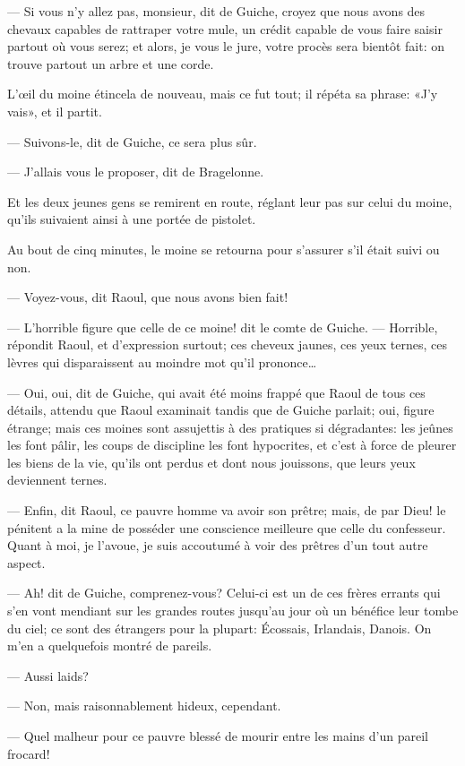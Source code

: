— Si vous n'y allez pas, monsieur, dit de Guiche, croyez que nous avons des chevaux capables de rattraper votre mule, un crédit capable de vous faire saisir partout où vous serez; et alors, je vous le jure, votre procès sera bientôt fait: on trouve partout un arbre et une corde.

L'œil du moine étincela de nouveau, mais ce fut tout; il répéta sa phrase: «J'y vais», et il partit.

— Suivons-le, dit de Guiche, ce sera plus sûr.

— J'allais vous le proposer, dit de Bragelonne.

Et les deux jeunes gens se remirent en route, réglant leur pas sur celui du moine, qu'ils suivaient ainsi à une portée de pistolet.

Au bout de cinq minutes, le moine se retourna pour s'assurer s'il était suivi ou non.

— Voyez-vous, dit Raoul, que nous avons bien fait!

— L'horrible figure que celle de ce moine! dit le comte de Guiche.
— Horrible, répondit Raoul, et d'expression surtout; ces cheveux jaunes, ces yeux ternes, ces lèvres qui disparaissent au moindre mot qu'il prononce\dots

— Oui, oui, dit de Guiche, qui avait été moins frappé que Raoul de tous ces détails, attendu que Raoul examinait tandis que de Guiche parlait; oui, figure étrange; mais ces moines sont assujettis à des pratiques si dégradantes: les jeûnes les font pâlir, les coups de discipline les font hypocrites, et c'est à force de pleurer les biens de la vie, qu'ils ont perdus et dont nous jouissons, que leurs yeux deviennent ternes.

— Enfin, dit Raoul, ce pauvre homme va avoir son prêtre; mais, de par Dieu! le pénitent a la mine de posséder une conscience meilleure que celle du confesseur. Quant à moi, je l'avoue, je suis accoutumé à voir des prêtres d'un tout autre aspect.

— Ah! dit de Guiche, comprenez-vous? Celui-ci est un de ces frères errants qui s'en vont mendiant sur les grandes routes jusqu'au jour où un bénéfice leur tombe du ciel; ce sont des étrangers pour la plupart: Écossais, Irlandais, Danois. On m'en a quelquefois montré de pareils.

— Aussi laids?

— Non, mais raisonnablement hideux, cependant.

— Quel malheur pour ce pauvre blessé de mourir entre les mains d'un pareil frocard!

